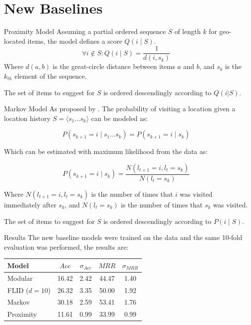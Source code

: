 \documentclass{beamer}
\begin{document}
  \section{New Baselines}
  
  \begin{frame}{Proximity Model}
    Assuming a partial ordered sequence $S$ of length $k$ for geo-located items, the model defines a score $Q(i \mid S)$.
    \begin{equation}
      \forall{i \notin S}: Q(i \mid S) = \frac{1}{d(i, s_{k})}
    \end{equation}
    Where $d(a,b)$ is the great-circle distance between items $a$ and $b$, and $s_{k}$ is the $k_{th}$ element of the sequence.

    The set of items to suggest for $S$ is ordered descendingly according to $Q(i|S)$.
  \end{frame}
  
  \begin{frame}{Markov Model}
    As proposed by \cite{Kurashima2010}. The probability of visiting a location given a location history $S = \langle s_{1} \dots s_{k} \rangle$ can be modeled as:
    
    \begin{equation}
      P(s_{k+1} = i \mid s_{1} \dots s_{k}) = P(s_{k+1} = i \mid s_{k})
    \end{equation}
    
    Which can be estimated with maximum likelihood from the data as:
    
    \begin{equation}
      P(s_{k+1} = i \mid s_{k}) = \frac{N(l_{t+1} = i, l_{t} = s_{k})}{N(l_{t} = s_{k})}
    \end{equation}
    
    Where $N(l_{t+1} = i, l_{t} = s_{k})$ is the number of times that $i$ was visited immediately after $s_{k}$, and $N(l_{t} = s_{k})$ is the number of times that $s_{k}$ was visited.
    
    The set of items to suggest for $S$ is ordered descendingly according to $P(i \mid S)$.
  \end{frame}
  
  \begin{frame}{Results}
    The new baseline models were trained on the data and the same 10-fold evaluation was performed, the results are:
    \begin{table}
      \begin{tabularx}{0.7\textwidth}{X|c|c|c|c}
        Model         & $Acc$ & $\sigma_{Acc}$ & $MRR$ & $\sigma_{MRR}$ \\
        \hline
        Modular & 16.42 & 2.42 & 44.47 & 1.40 \\
        FLID ($d=10$) & 26.32 & 3.35 & 50.00 & 1.92 \\
        Markov & 30.18 & 2.59 & 53.41 & 1.76 \\
        Proximity & 11.61 & 0.99 & 33.99 & 0.99 \\
      \end{tabularx}
    \end{table}
  \end{frame}
  
\end{document}
